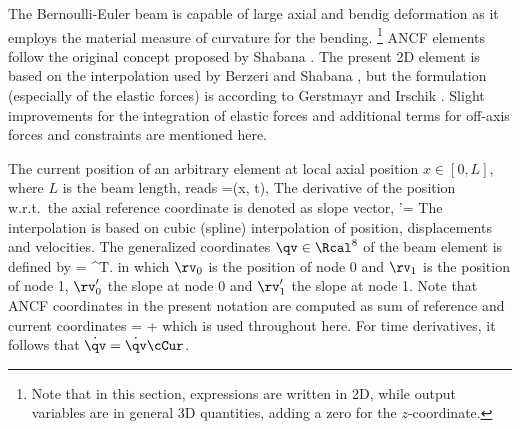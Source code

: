     \finishTable

    The Bernoulli-Euler beam is capable of large axial and bendig deformation as it employs the material measure of curvature for the bending.
%
    \footnote{Note that in this section, expressions are written in 2D, while output variables are in general 3D quantities, adding a zero for the $z$-coordinate.}
    ANCF elements follow the original concept proposed by Shabana \cite{shabana1997ancf}.
    The present 2D element is based on the interpolation used by Berzeri and Shabana \cite{berzeri2000}, but the formulation (especially of the elastic forces) is according to
    Gerstmayr and Irschik \cite{GerstmayrIrschik2008}.
    Slight improvements for the integration of elastic forces and additional terms for off-axis forces and constraints are mentioned here.
    
    The current position of an arbitrary element at local axial position $x \in [0,L]$, where $L$ is the beam length, reads
    \be
      \rv=\rv(x, t),
    \ee
    The derivative of the position w.r.t.\ the axial reference coordinate is denoted as slope vector,
    \be
      \rv'= 
    \ee
    The interpolation is based on cubic (spline) interpolation of position, displacements and velocities.
    The generalized coordinates $\qv \in \Rcal^8$ of the beam element is defined by
    \be
      \qv= \left[\, \rv_0^{T}\;\;\rv_0^{' T}\;\; \rv_1^{T}\;\; \rv_1^{' T}\, \right]^{T}.
    \ee
    in which $\rv_0$ is the position of node 0 and $\rv_1$ is the position of node 1,
    $\rv'_0$ the slope at node 0 and $\rv'_1$ the slope at node 1.
    Note that ANCF coordinates in the present notation are computed as sum of reference and current coordinates
    \be
      \qv = \qv\cCur + \qv\cRef
    \ee
    which is used throughout here. For time derivatives, it follows that $\dot \qv = \dot \qv\cCur$.
    
